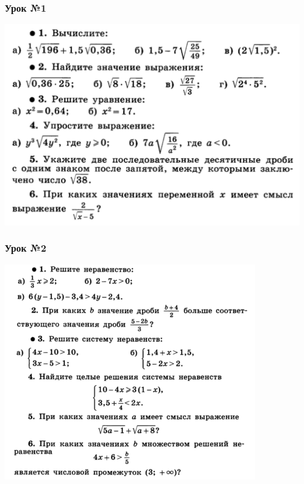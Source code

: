 \documentclass[algebra,a5paper]{pum}
\date{07.05.20}
\begin{document}
\subsubsection*{Урок №1}
\includegraphics[width=\textwidth]{img/20-1.png}

\subsubsection*{Урок №2}
\includegraphics[width=\textwidth]{img/20-2.png}
\end{document}
